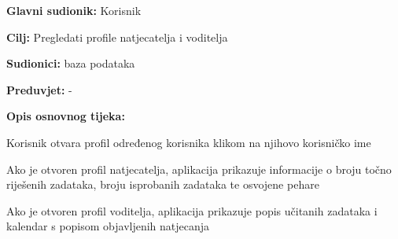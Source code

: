 					
					\noindent {}
					\begin{packed_item}
						
						\item \textbf{Glavni sudionik: }Korisnik
						\item \textbf{Cilj:} Pregledati profile natjecatelja i voditelja
						\item \textbf{Sudionici:} baza podataka
						\item \textbf{Preduvjet:} -
						\item \textbf{Opis osnovnog tijeka:}
						
						\item[] \begin{packed_enum}
							\item Korisnik otvara profil određenog korisnika klikom na njihovo korisničko ime
							\item Ako je otvoren profil natjecatelja, aplikacija prikazuje informacije o broju točno riješenih zadataka, broju isprobanih zadataka te osvojene pehare
							\item Ako je otvoren profil voditelja, aplikacija prikazuje popis učitanih zadataka i kalendar s popisom objavljenih natjecanja
						\end{packed_enum}
					\end{packed_item}
					
					
					
